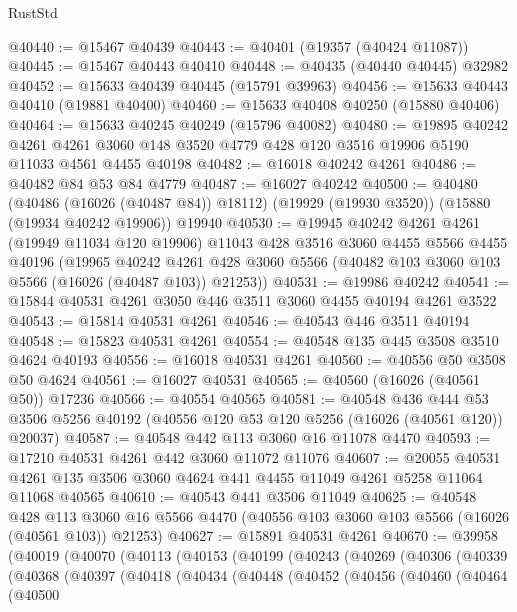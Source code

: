 \begin{lexlean}{RustStd}
\begin{coremodule}
@40440 := @15467 @40439
@40443 := @40401 (@19357 (@40424 @11087))
@40445 := @15467 @40443 @40410
@40448 := @40435 (@40440 @40445) @32982
@40452 := @15633 @40439 @40445 (@15791 @39963)
@40456 := @15633 @40443 @40410 (@19881 @40400)
@40460 := @15633 @40408 @40250 (@15880 @40406)
@40464 := @15633 @40245 @40249 (@15796 @40082)
@40480 := @19895
    @40242
    @4261
    @4261
    @3060
    @148
    @3520
    @4779
    @428
    @120
    @3516
    @19906
    @5190
    @11033
    @4561
    @4455
    @40198
@40482 := @16018 @40242 @4261
@40486 := @40482 @84 @53 @84 @4779
@40487 := @16027 @40242
@40500 := @40480
    (@40486 (@16026 (@40487 @84)) @18112)
    (@19929 (@19930 @3520))
    (@15880 (@19934 @40242 @19906))
    @19940
@40530 := @19945
    @40242
    @4261
    @4261
    (@19949 @11034 @120 @19906)
    @11043
    @428
    @3516
    @3060
    @4455
    @5566
    @4455
    @40196
    (@19965
      @40242
      @4261
      @428
      @3060
      @5566
      (@40482 @103 @3060 @103 @5566 (@16026 (@40487 @103)) @21253))
@40531 := @19986 @40242
@40541 := @15844 @40531 @4261 @3050 @446 @3511 @3060 @4455 @40194 @4261 @3522
@40543 := @15814 @40531 @4261
@40546 := @40543 @446 @3511 @40194
@40548 := @15823 @40531 @4261
@40554 := @40548 @135 @445 @3508 @3510 @4624 @40193
@40556 := @16018 @40531 @4261
@40560 := @40556 @50 @3508 @50 @4624
@40561 := @16027 @40531
@40565 := @40560 (@16026 (@40561 @50)) @17236
@40566 := @40554 @40565
@40581 := @40548
    @436
    @444
    @53
    @3506
    @5256
    @40192
    (@40556 @120 @53 @120 @5256 (@16026 (@40561 @120)) @20037)
@40587 := @40548 @442 @113 @3060 @16 @11078 @4470
@40593 := @17210 @40531 @4261 @442 @3060 @11072 @11076
@40607 := @20055
    @40531
    @4261
    @135
    @3506
    @3060
    @4624
    @441
    @4455
    @11049
    @4261
    @5258
    @11064
    @11068
    @40565
@40610 := @40543 @441 @3506 @11049
@40625 := @40548
    @428
    @113
    @3060
    @16
    @5566
    @4470
    (@40556 @103 @3060 @103 @5566 (@16026 (@40561 @103)) @21253)
@40627 := @15891 @40531 @4261
@40670 := @39958
    (@40019
      (@40070
        (@40113
          (@40153
            (@40199
              (@40243
                (@40269
                  (@40306
                    (@40339
                      (@40368
                        (@40397
                          (@40418
                            (@40434
                              (@40448
                                (@40452
                                  (@40456
                                    (@40460
                                      (@40464
                                        (@40500

\end{coremodule}
\end{lexlean}

